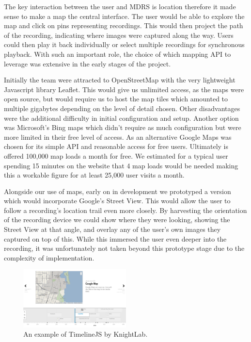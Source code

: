 \documentclass{l3proj}
\begin{document}
The key interaction between the user and MDRS is location therefore it made sense to make a map the central interface. The user would be able to explore the map and click on pins representing recordings. This would then project the path of the recording, indicating where images were captured along the way. Users could then play it back individually or select multiple recordings for synchronous playback. With such an important role, the choice of which mapping API to leverage was extensive in the early stages of the project.

Initially the team were attracted to OpenStreetMap with the very lightweight Javascript library Leaflet. This would give us unlimited access, as the maps were open source, but would require us to host the map tiles which amounted to multiple gigabytes depending on the level of detail chosen. Other disadvantages were the additional difficulty in initial configuration and setup. Another option was Microsoft’s Bing maps which didn’t require as much configuration but were more limited in their free level of access. As an alternative Google Maps was chosen for its simple API and reasonable access for free users. Ultimately is offered 100,000 map loads a month for free. We estimated for a typical user spending 15 minutes on the website that 4 map loads would be needed making this a workable figure for at least 25,000 user visits a month.

Alongside our use of maps, early on in development we prototyped a version which would incorporate Google's Street View. This would allow the user to follow a recording's location trail even more closely. By harvesting the orientation of the recording device we could show where they were looking, showing the Street View at that angle, and overlay any of the user's own images they captured on top of this. While this immersed the user even deeper into the recording, it was unfortunately not taken beyond this prototype stage due to the complexity of implementation.

\begin{figure}[ht!]
  \centering
\includegraphics[width=0.5\textwidth]{images/timeline-example.png}
\caption{An example of TimelineJS by KnightLab.}
\end{figure}
\end{document}
